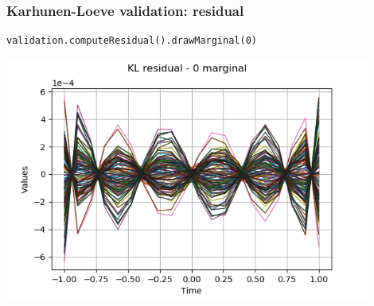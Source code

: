 \documentclass{beamer}
\begin{document}
\begin{frame}[containsverbatim]
\frametitle{Karhunen-Loeve validation: residual}
% 
% 
\begin{lstlisting}
validation.computeResidual().drawMarginal(0)
\end{lstlisting}
% 
\begin{center}
\includegraphics[width=0.9\textwidth]{figures/kl1.png}
\end{center}
\end{frame}
\end{document}
